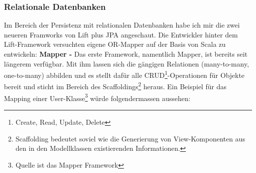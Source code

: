 \subsubsection{Relationale Datenbanken}
Im Bereich der Persistenz mit relationalen Datenbanken habe ich mir die zwei neueren Framworks von Lift  plus JPA angeschaut. Die Entwickler hinter dem Lift-Framework versuchten eigene OR-Mapper auf der Basis von Scala zu entwickeln: \newline\newline
\textbf{Mapper - }Das erste Framework, namentlich Mapper, ist bereits seit l\"angerem verf\"ugbar. Mit ihm lassen sich die g\"angigen Relationen (many-to-many, one-to-many) abbilden und es stellt daf\"ur alle CRUD\footnote{Create, Read, Update, Delete}-Operationen f\"ur Objekte bereit und sticht im Bereich des Scaffoldings\footnote{Scaffolding bedeutet soviel wie die Generierung von View-Komponenten aus den in den Modellklassen existierenden Informationen.} heraus. \newline\newline
Ein Beispiel f\"ur das Mapping einer User-Klasse\footnote{Quelle ist das Mapper Framework} w\"urde folgendermassen aussehen:

